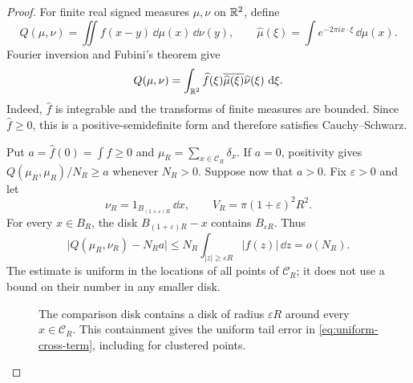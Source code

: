 \begin{proof}
For finite real signed measures $\mu,\nu$ on $\mathbb R^2$, define
\[
 Q(\mu,\nu)=\iint f(x-y)\,\dd\mu(x)\,\dd\nu(y),
 \qquad
 \widehat\mu(\xi)=\int e^{-2\pi i x\cdot\xi}\,\dd\mu(x).
\]
Fourier inversion and Fubini's theorem give
\[
 Q(\mu,\nu)=\int_{\mathbb R^2}\widehat f(\xi)
       \overline{\widehat\mu(\xi)}\widehat\nu(\xi)\,\mathop{}\!\mathrm d\xi.
\]
Indeed, $\widehat f$ is integrable and the transforms of finite measures are
bounded.  Since $\widehat f\ge0$, this is a positive-semidefinite form and
therefore satisfies Cauchy--Schwarz.

Put $a=\widehat f(0)=\int f\ge0$ and
$\mu_R=\sum_{x\in\mathcal C_R}\delta_x$.  If $a=0$, positivity gives
$Q(\mu_R,\mu_R)/N_R\ge a$ whenever $N_R>0$.  Suppose now that $a>0$.
Fix $\varepsilon>0$ and let
\[
 \nu_R=1_{B_{(1+\varepsilon)R}}\,\dd x,
 \qquad V_R=\pi(1+\varepsilon)^2R^2.
\]
For every $x\in B_R$, the disk $B_{(1+\varepsilon)R}-x$ contains
$B_{\varepsilon R}$.  Thus
\begin{equation}\label{eq:uniform-cross-term}
 \bigl|Q(\mu_R,\nu_R)-N_Ra\bigr|
 \le N_R\int_{|z|\ge\varepsilon R}|f(z)|\,\dd z=o(N_R).
\end{equation}
The estimate is uniform in the locations of all points of $\mathcal C_R$;
it does not use a bound on their number in any smaller disk.

\begin{figure}[tb]
\centering
{}
\caption{The comparison disk contains a disk of radius $\varepsilon R$
 around every $x\in\mathcal C_R$.  This containment gives the uniform tail
 error in \eqref{eq:uniform-cross-term}, including for clustered points.}
\label{fig:larger-disk}
\end{figure}


\end{proof}

